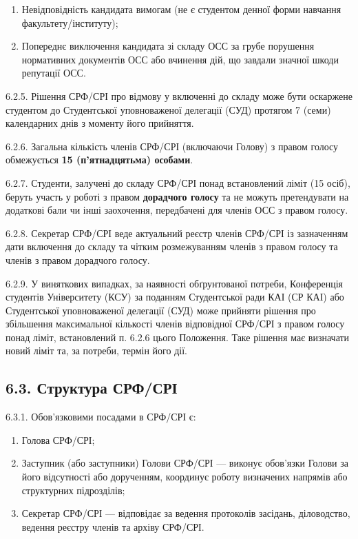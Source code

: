         \begin{enumerate}[label=\alph*)]
            \item Невідповідність кандидата вимогам (не є студентом денної форми навчання факультету/інституту);
            \item Попереднє виключення кандидата зі складу ОСС за грубе порушення нормативних документів ОСС або вчинення дій, що завдали значної шкоди репутації ОСС.
        \end{enumerate}

    6.2.5. Рішення СРФ/СРІ про відмову у включенні до складу може бути оскаржене студентом до Студентської уповноваженої делегації (СУД) протягом 7 (семи) календарних днів з моменту його прийняття.

    6.2.6. Загальна кількість членів СРФ/СРІ (включаючи Голову) з правом голосу обмежується \textbf{15 (п'ятнадцятьма) особами}.

    6.2.7. Студенти, залучені до складу СРФ/СРІ понад встановлений ліміт (15 осіб), беруть участь у роботі з правом \textbf{дорадчого голосу} та не можуть претендувати на додаткові бали чи інші заохочення, передбачені для членів ОСС з правом голосу.

    6.2.8. Секретар СРФ/СРІ веде актуальний реєстр членів СРФ/СРІ із зазначенням дати включення до складу та чітким розмежуванням членів з правом голосу та членів з правом дорадчого голосу.

    6.2.9. У виняткових випадках, за наявності обґрунтованої потреби, Конференція студентів Університету (КСУ) за поданням Студентської ради КАІ (СР КАІ) або Студентської уповноваженої делегації (СУД) може прийняти рішення про збільшення максимальної кількості членів відповідної СРФ/СРІ з правом голосу понад ліміт, встановлений п. 6.2.6 цього Положення. Таке рішення має визначати новий ліміт та, за потреби, термін його дії.

\subsection*{6.3. Структура СРФ/СРІ}
    6.3.1. Обов'язковими посадами в СРФ/СРІ є:

        \begin{enumerate}[label=\alph*)]
            \item Голова СРФ/СРІ;
            \item Заступник (або заступники) Голови СРФ/СРІ — виконує обов'язки Голови за його відсутності або дорученням, координує роботу визначених напрямів або структурних підрозділів;
            \item Секретар СРФ/СРІ — відповідає за ведення протоколів засідань, діловодство, ведення реєстру членів та архіву СРФ/СРІ.
        \end{enumerate}

